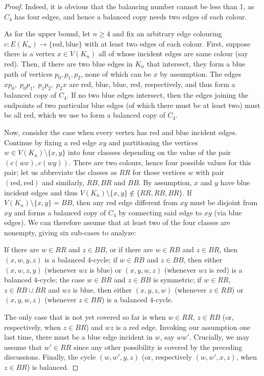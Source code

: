 \begin{proof}    
    Indeed, it is obvious that the balancing number cannot be less than 1, as $C_4$ has four edges, and hence a balanced copy needs two edges of each colour.

    As for the upper bound, let $n\geq 4$ and fix an arbitrary edge colouring $c\colon E(K_n)\to\{\text{red},\text{blue}\}$ with at least two edges of each colour.
    First, suppose there is a vertex $x\in V(K_n)$ all of whose incident edges are same colour (say red).
    Then, if there are two blue edges in $K_n$ that intersect, they form a blue path of vertices $p_0,p_1,p_2$, none of which can be $x$ by assumption.
    The edges $xp_0,\; p_0p_1,\; p_1p_2,\; p_2x$ are red, blue, blue, red, respectively, and thus form a balanced copy of $C_4$.
    If no two blue edges intersect, then the edges joining the endpoints of two particular blue edges (of which there must be at least two) must be all red, which we use to form a balanced copy of $C_4$.
    
    Now, consider the case when every vertex has red and blue incident edges.
    Continue by fixing a red edge $xy$ and partitioning the vertices $w\in V(K_n)\setminus\{x,y\}$ into four classses depending on the value of the pair $(c(wx),c(wy))$.
    There are two colours, hence four possible values for this pair; let us abbreviate the classes as $RR$ for those vertices $w$ with pair $(\text{red},\text{red})$ and similarly, $RB,BR$ and $BB$.
    By assumption, $x$ and $y$ have blue incident edges and thus $V(K_n)\setminus\{x,y\}\notin\{RR,RB,BR\}$.
    If $V(K_n)\setminus\{x,y\}=BB$, then any red edge different from $xy$ must be disjoint from $xy$ and forms a balanced copy of $C_4$ by connecting said edge to $xy$ (via blue edges).
    We can therefore assume that at least two of the four classes are nonempty, giving six sub-cases to analyze:

    If there are $w\in RR$ and $z\in BB$, or if there are $w\in RB$ and $z\in BR$, then $(x,w,y,z)$ is a balanced $4$-cycle; if $w\in RB$ and $z\in BB$, then either $(x,w,z,y)$ (whenever $wz$ is blue) or $(x,y,w,z)$ (whenever $wz$ is red) is a balanced $4$-cycle; the case $w\in BR$ and $z\in BB$ is symmetric; if $w\in RR$, $z\in RB\cup BR$ and $wz$ is blue, then either $(x,y,z,w)$ (whenever $z\in RB$) or $(x,y,w,z)$ (whenever $z\in BR$) is a balanced $4$-cycle.
    
    The only case that is not yet covered so far is when $w\in RR$, $z\in RB$ (or, respectively, when $z\in BR$) and $wz$ is a red edge.
    Invoking our assumption one last time, there must be a blue edge incident in $w$, say $ww'$.
    Crucially, we may assume that $w'\in RR$ since any other possibility is covered by the preceding discussions.
    Finally, the cycle $(w,w',y,z)$ (or, respectively $(w,w',x,z)$, when $z\in BR$) is balanced.
\end{proof}

